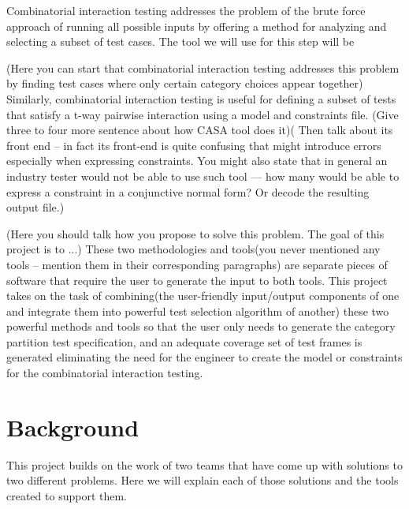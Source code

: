 \documentclass[a4full,12pt]{article}
\newcommand{\eas}[1]{{\color{blue}\sf ({#1})}}
\begin{document}
Combinatorial interaction testing addresses the problem of the brute force approach of running all
  possible inputs by offering a method for analyzing and selecting a subset of test cases. The tool
  we will use for this step will be 


\eas{Here you can start that combinatorial interaction testing addresses this problem by finding test cases where only certain category choices appear together}
 Similarly, combinatorial interaction testing is useful for defining a subset of tests that satisfy a t-way pairwise interaction using a model and constraints file. \eas{Give three to four more sentence about how  CASA tool does it}\eas{ Then talk about its front end -- in fact its front-end is quite confusing that might introduce errors especially when expressing constraints. You might also state that in general an industry tester would not be able to use such tool --- how many would be able to express a constraint in a conjunctive normal form? Or decode the resulting output file.}
 
\eas{Here you should talk how you propose to solve this problem. The goal of this project is to ...} These two methodologies and tools\eas{you never mentioned any tools -- mention them in their corresponding paragraphs} are separate pieces of software that require the user  to generate the input to both tools. This project takes on the task of combining\eas{the user-friendly input/output components of one and integrate them into powerful test selection algorithm of another} these two powerful methods and tools so that the user only needs to generate the category partition test specification, and an adequate coverage set of test frames is generated eliminating the need for the engineer to create the model or constraints for the combinatorial interaction testing.

  
\section{Background}
This project builds on the work of two teams that have come up with solutions to
  two different problems. Here we will explain each of those solutions and the 
  tools created to support them.
\end{document}
